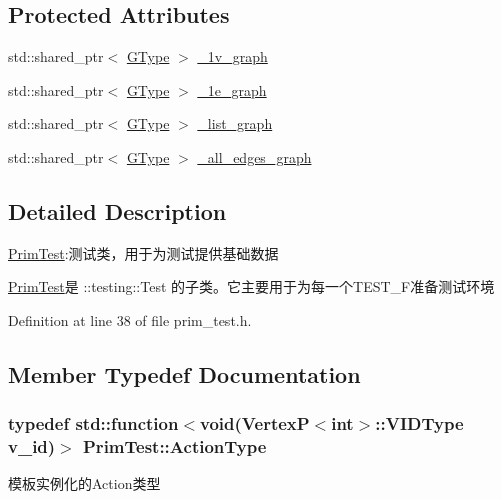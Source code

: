\subsection*{Protected Attributes}
\begin{DoxyCompactItemize}
\item 
std\+::shared\+\_\+ptr$<$ \hyperlink{class_prim_test_a007bd8e1bdac3f8548d0a4bebce87881}{G\+Type} $>$ \hyperlink{class_prim_test_a7ff7449d84167db478a33a4dbb1b2e78}{\+\_\+1v\+\_\+graph}
\item 
std\+::shared\+\_\+ptr$<$ \hyperlink{class_prim_test_a007bd8e1bdac3f8548d0a4bebce87881}{G\+Type} $>$ \hyperlink{class_prim_test_a256859b15df61e1cd0c96065bf19dc71}{\+\_\+1e\+\_\+graph}
\item 
std\+::shared\+\_\+ptr$<$ \hyperlink{class_prim_test_a007bd8e1bdac3f8548d0a4bebce87881}{G\+Type} $>$ \hyperlink{class_prim_test_aeac490b81dfcef56b2a8b656942b012a}{\+\_\+list\+\_\+graph}
\item 
std\+::shared\+\_\+ptr$<$ \hyperlink{class_prim_test_a007bd8e1bdac3f8548d0a4bebce87881}{G\+Type} $>$ \hyperlink{class_prim_test_a25281c926fc389770548b0f035e41615}{\+\_\+all\+\_\+edges\+\_\+graph}
\end{DoxyCompactItemize}


\subsection{Detailed Description}
\hyperlink{class_prim_test}{Prim\+Test}\+:测试类，用于为测试提供基础数据 

{\ttfamily \hyperlink{class_prim_test}{Prim\+Test}}是 {\ttfamily \+::testing\+::\+Test} 的子类。它主要用于为每一个{\ttfamily T\+E\+S\+T\+\_\+\+F}准备测试环境 

Definition at line 38 of file prim\+\_\+test.\+h.



\subsection{Member Typedef Documentation}
\hypertarget{class_prim_test_a834237db99fdb38480aa6ba46b509e9e}{}
\subsubsection[{Action\+Type}]{\setlength{\rightskip}{0pt plus 5cm}typedef std\+::function$<$void({\bf Vertex\+P}$<$int$>$\+::V\+I\+D\+Type v\+\_\+id)$>$ {\bf Prim\+Test\+::\+Action\+Type}}\label{class_prim_test_a834237db99fdb38480aa6ba46b509e9e}
模板实例化的\+Action类型 

